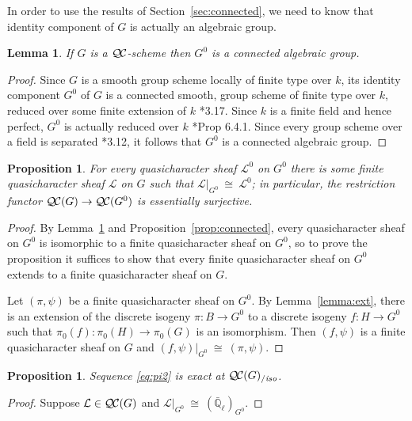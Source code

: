 \documentclass[11pt]{amsart}
\theoremstyle{plain}
\newtheorem{proposition}[theorem]{Proposition}
\newtheorem{lemma}[theorem]{Lemma}
\theoremstyle{definition}
\theoremstyle{remark}
\newcommand{\EE}{\mathbb{\bar Q}_\ell}
\newcommand{\Fq}{k}
\newcommand{\iso}{{\ \cong\ }}
\newcommand{\qcs}[1]{{\mathcal{#1}}}
\newcommand{\QC}{{\mathcal{Q\hskip-0.8pt C}}}
\newcommand{\QCiso}[1]{\QC(#1)_{/\textit{iso}}}
\begin{document}
In order to use the results of Section~\ref{sec:connected}, we need to know that
identity component of $G$ is actually an algebraic group.

\begin{lemma} \label{lem:G0alg-grp}
If $G$ is a $\QC$-scheme then $G^0$ is a connected algebraic group.
\end{lemma}
\begin{proof}
 Since $G$ is a smooth group scheme locally of finite type over $\Fq$, its
 identity component $G^0$ of $G$ is a connected smooth, 
 group scheme of finite type over $\Fq$, reduced over some finite extension of $\Fq$
 \cite{vdGeer-Moonen:AbelianVarieties}*{3.17}. 
 Since $\Fq$ is a finite field and hence perfect, $G^0$ is actually reduced over $\Fq$
 \cite{EGAIV2}*{Prop 6.4.1}.  Since every group scheme over a field is separated 
 \cite{vdGeer-Moonen:AbelianVarieties}*{3.12},
 it follows that $G^0$ is a connected algebraic group.
\end{proof}

\begin{proposition}\label{prop:restriction}
For every quasicharacter sheaf $\qcs{L}^0$ on $G^0$ there is some finite quasicharacter sheaf $\qcs{L}$ on $G$ such that $\qcs{L}\vert_{G^0} \iso \qcs{L}^0$;
in particular, the restriction functor $\QC(G)\to \QC(G^0)$ is essentially surjective.
\end{proposition}

\begin{proof}
  By Lemma~\ref{lem:G0alg-grp} and Proposition~\ref{prop:connected}, every
  quasicharacter sheaf on $G^0$ is isomorphic to a 
  finite quasicharacter sheaf on $G^0$, 
  so to prove the proposition it suffices to show that every 
  finite quasicharacter sheaf on $G^0$ extends to a finite quasicharacter sheaf on $G$.
  
 Let $(\pi,\psi)$ be a finite quasicharacter sheaf on $G^0$.
 By Lemma~\ref{lemma:ext}, there is an extension of the 
 discrete isogeny $\pi : B \to G^0$ to a discrete isogeny $f : H \to G^0$ 
 such that $\pi_0(f) : \pi_0(H)\to \pi_0(G)$ is an isomorphism.
 Then $(f,\psi)$ is a finite quasicharacter sheaf on $G$ and 
 $(f,\psi)\vert_{G^0} \iso (\pi,\psi)$.
\end{proof}

\begin{proposition}\label{prop:middleexact}
Sequence \eqref{eq:pi2} is exact at $\QCiso{G}$.
\end{proposition}

\begin{proof}
Suppose $\qcs{L} \in \QC(G)$ and $\qcs{L}\vert_{G^0} \iso (\EE)_{G^0}$.
\end{proof}
\end{document}
